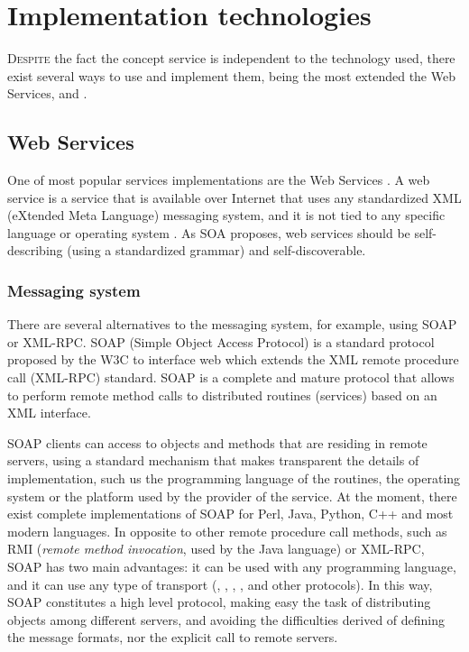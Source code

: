 \section{Implementation technologies}

\lettrine{D}{espite} the fact the concept service is independent to the technology used, there exist several ways to use and implement them, being the most extended the Web Services,  and .

\subsection{Web Services}

One of most popular services implementations are the Web Services \cite{Papazoglou2007SOA}. A web service is a service that is available over Internet that uses any standardized XML (eXtended Meta Language) \cite{XML} messaging system, and it is not tied to any specific language or operating system \cite{Cerami2002Webservices}.  As SOA proposes, web services should be self-describing (using a standardized grammar) and self-discoverable.

\subsubsection{Messaging system} There are several alternatives to the messaging system, for example, using SOAP or XML-RPC. SOAP (Simple Object Access Protocol) is a standard protocol proposed by the W3C \cite{SOAP} to interface web  which  extends the XML remote procedure call (XML-RPC) standard. 
SOAP is a complete and mature protocol that allows to perform remote method calls to distributed routines (services) based on an XML interface.

SOAP clients can access to objects and methods that are residing in remote servers, using a standard mechanism that makes transparent the details of implementation, such us the programming language of the
routines, the operating system or the platform used by the provider of the service. 
At the moment, there exist complete implementations of SOAP for Perl, Java, Python, C++ and most modern languages.
In opposite to other remote procedure call methods, such as RMI (\emph{remote method invocation}, used by the Java language) or XML-RPC, SOAP has two main advantages: it can be used with any programming language, and it can use any type of transport (, , , ,  and other protocols). In this way, SOAP constitutes a high level protocol, making easy the task of distributing objects among different servers, and avoiding the difficulties derived of defining the message formats, nor the explicit call to remote servers.


